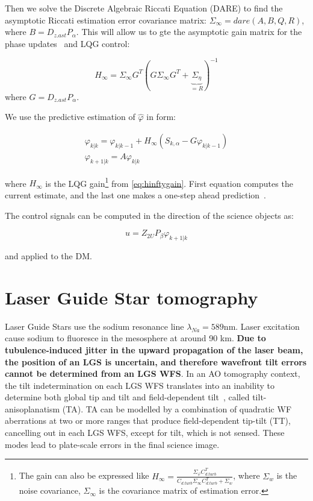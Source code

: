 \documentclass[a4paper,12pt]{article}
\begin{document}
Then we solve the Discrete Algebraic Riccati Equation (DARE) to find the asymptotic Riccati estimation error covariance matrix: $\Sigma_\infty = dare(A,B,Q,R)$, where $B = D_{z.ast} P_\alpha$. This will allow us to gte the asymptotic gain matrix for the phase updates~\cite{correia2015spatio} and LQG control:

\begin{equation}\label{eq:hinftygain}
 H_\infty  = \Sigma_\infty G^T (G\Sigma_\infty G^T + \underbrace{\Sigma_\eta}_{=R} )^{-1}
\end{equation} 
where $G = D_{z.ast} P_\alpha$.

We use the predictive estimation of $\hat{\varphi}$ in form:

\begin{eqnarray}
\varphi_{k|k} = \varphi_{k|k-1} +H_\infty(S_{k, \alpha}  - G \varphi_{k|k-1}) \\
\varphi_{k+1|k} = A \varphi_{k|k} 
\end{eqnarray} 

where $H_{\infty}$ is the LQG gain\footnote{The gain can also be expressed like $H_\infty = \frac{\Sigma_\varphi C_{d.turb}^T}{C_{d.turb} \Sigma_\infty C_{d.turb}^T  + \Sigma_w}$, where $\Sigma_w$ is the noise covariance, $\Sigma_\infty $ is the covariance matrix of estimation error. } from \eqref{eq:hinftygain}. First equation computes the current estimate, and the last one makes a one-step ahead prediction~\cite{correia2015spatio}. 

The control signals can be computed in the direction of the science objects as:

$$u = Z_{2U} P_\beta \varphi_{k+1|k}$$

and applied to the DM.




\section{Laser Guide Star tomography}
Laser Guide Stars use the sodium resonance line $\lambda_{Na} = 589$nm. Laser excitation cause sodium to fluoresce in the mesosphere at around 90 km. \textbf{Due to tubulence-induced jitter in the upward propagation of the laser beam, the position of an LGS is uncertain, and therefore wavefront tilt errors cannot be determined from an LGS WFS}. In an AO tomography context, the tilt indetermination on each LGS WFS translates into an inability to determine both global tip and tilt and field-dependent tilt~\cite{flicker2003tilt}, called tilt-anisoplanatism (TA). TA can be modelled by a combination of quadratic WF aberrations at two or more ranges that produce field-dependent tip-tilt (TT), cancelling out in each LGS WFS, except for tilt, which is not sensed. These modes lead to
plate-scale errors in the final science image.
\end{document}
